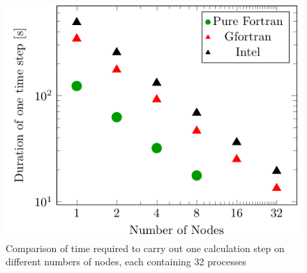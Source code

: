 \begin{figure}[ht]
 \centering
 \includegraphics[width=.7\textwidth]{Figs/PythonScaling/Speeds}
 \caption{\label{fig::Timing Comparison}Comparison of time required to carry out one calculation step on different numbers of nodes, each containing 32 processes }
\end{figure}
